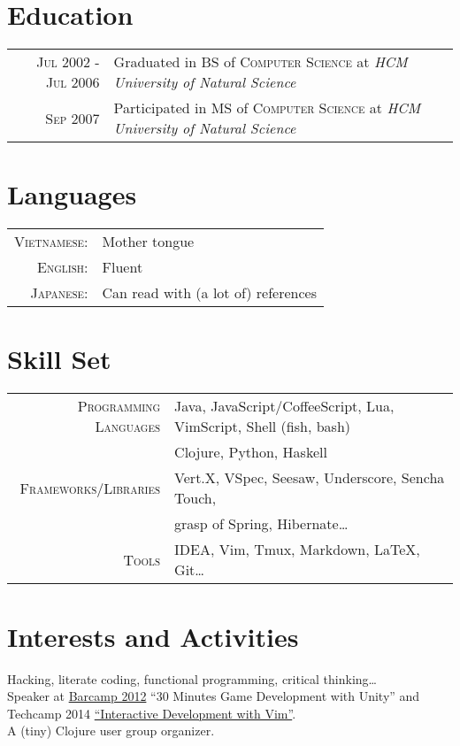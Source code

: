 \documentclass[a4paper,10pt]{article}
\begin{document}
\hfill
\section{Education}
\begin{tabular}{rl}
  \textsc{Jul} 2002 - \textsc{Jul} 2006 & Graduated in BS of \textsc{Computer Science} at \textit{HCM University of Natural Science}\\
  \textsc{Sep} 2007 & Participated in MS of \textsc{Computer Science} at \textit{HCM University of Natural Science}\\
\end{tabular}


\section{Languages}
\begin{tabular}{rl}
 \textsc{Vietnamese:} & Mother tongue\\
 \textsc{English:} & Fluent\\
 \textsc{Japanese:} & Can read with (a lot of) references\\
\end{tabular}

\section{Skill Set}
\begin{tabular}{rl}
    \textsc{Programming Languages} & Java, JavaScript/CoffeeScript, Lua, VimScript, Shell (fish, bash)\\
                                   & Clojure, Python, Haskell\\
    \textsc{Frameworks/Libraries} & Vert.X, VSpec, Seesaw, Underscore, Sencha Touch,\\
                                  & grasp of Spring, Hibernate\ldots\\
    \textsc{Tools} & IDEA, Vim, Tmux, Markdown, \LaTeX, Git\ldots\\
\end{tabular}

\section{Interests and Activities}
Hacking, literate coding, functional programming, critical thinking\ldots\\
Speaker at \href{http://www.barcampsaigon.org/2012/09/thank-you-barcampers-sponsors-volunteers/}{Barcamp 2012} ``30 Minutes Game Development with Unity'' and Techcamp 2014 \href{http://www.slideshare.net/huylenq/interactive-development-with-vim-techcamp}{``Interactive Development with Vim''}.\\
A (tiny) Clojure user group organizer.\\


\end{document}
